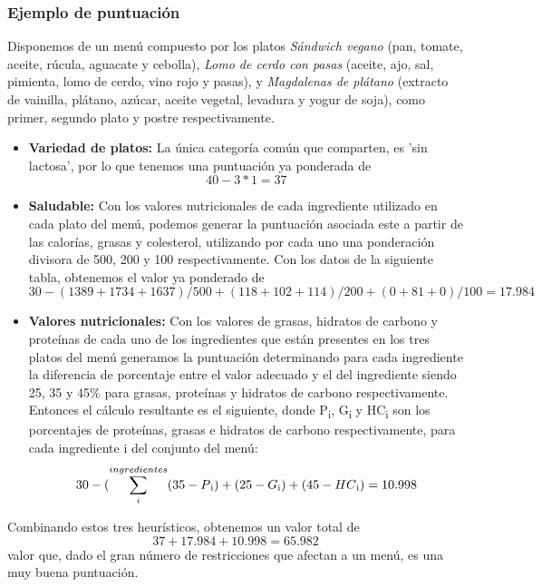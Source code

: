 \documentclass{article}
\begin{document}
\subsubsection{Ejemplo de puntuación}
Disponemos de un menú compuesto por los platos \textit{Sándwich vegano} (pan, tomate, aceite, rúcula, aguacate y cebolla), \textit{Lomo de cerdo con pasas} (aceite, ajo, sal, pimienta, lomo de cerdo, vino rojo y pasas), y \textit{Magdalenas de plátano} (extracto de vainilla, plátano, azúcar, aceite vegetal, levadura y yogur de soja), como primer, segundo plato y postre respectivamente.
\begin{itemize}
    \item \textbf{Variedad de platos:} La única categoría común que comparten, es 'sin lactosa', por lo que tenemos una puntuación ya ponderada de $$40 - 3*1 = 37$$
    \item \textbf{Saludable:} Con los valores nutricionales de cada ingrediente utilizado en cada plato del menú, podemos generar la puntuación asociada este a partir de las calorías, grasas y colesterol, utilizando por cada uno una ponderación divisora de 500, 200 y 100 respectivamente. Con los datos de la siguiente tabla, obtenemos el valor ya ponderado de $$30 - (1389 + 1734 + 1637) / 500 + (118 + 102 + 114) / 200 + (0 + 81 + 0) / 100 = 17.984$$
    \item \textbf{Valores nutricionales:} Con los valores de grasas, hidratos de carbono y proteínas de cada uno de los ingredientes que están presentes en los tres platos del menú generamos la puntuación determinando para cada ingrediente la diferencia de porcentaje entre el valor adecuado y el del ingrediente siendo 25, 35 y 45\% para grasas, proteínas y hidratos de carbono respectivamente. Entonces el cálculo resultante es el siguiente, donde P\textsubscript{i}, G\textsubscript{i} y HC\textsubscript{i} son los porcentajes de proteínas, grasas e hidratos de carbono respectivamente, para cada ingrediente i del conjunto del menú:
    $$30 - (\sum_{i}^{ingredientes}(35 - P\textsubscript{i}) + (25 - G\textsubscript{i}) + (45 - HC\textsubscript{i}) = 10.998$$
\end{itemize}

Combinando estos tres heurísticos, obtenemos un valor total de $$37 + 17.984 + 10.998 = 65.982$$ valor que, dado el gran número de restricciones que afectan a un menú, es una muy buena puntuación.
\end{document}
